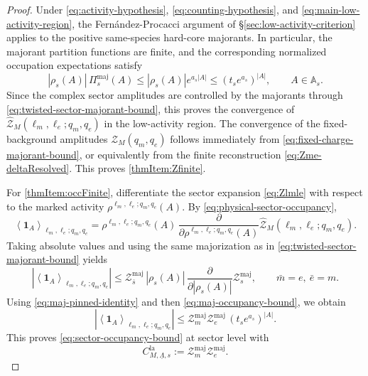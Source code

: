 \begin{proof}
	Under \eqref{eq:activity-hypothesis}, \eqref{eq:counting-hypothesis}, and
	\eqref{eq:main-low-activity-region}, the Fernández-Procacci argument of
	\S\ref{sec:low-activity-criterion} applies to the positive same-species hard-core
	majorants. In particular, the majorant partition functions are finite, and the
	corresponding normalized occupation expectations satisfy
	\begin{equation}
		|\rho_s(A)|\,\Pi_s^{\mathrm{maj}}(A)
		\le
		|\rho_s(A)|e^{a_s|A|}
		\le
		(t_s e^{a_s})^{|A|},
		\qquad
		A\in\mathbb A_s.
		\label{eq:maj-occupancy-bound}
	\end{equation}
	Since the complex sector amplitudes are controlled by the majorants through
	\eqref{eq:twisted-sector-majorant-bound}, this proves the convergence of
	\(\widehat{\mathcal Z}_M(\ell_m,\ell_e;q_m,q_e)\) in the low-activity region. The
	convergence of the fixed-background amplitudes \(\mathcal Z_M(q_m,q_e)\) follows
	immediately from \eqref{eq:fixed-charge-majorant-bound}, or equivalently from the
	finite reconstruction \eqref{eq:Zme-deltaResolved}. This proves
	\ref{thmItem:Zfinite}.
	
	For \ref{thmItem:occFinite}, differentiate the sector expansion \eqref{eq:Zlmle} with
	respect to the marked activity \(\rho^{\ell_m,\ell_e;q_m,q_e}(A)\). By
	\eqref{eq:physical-sector-occupancy},
	\begin{equation}
		\left\langle \mathbf 1_A \right\rangle_{\ell_m,\ell_e;q_m,q_e}
		=
		\rho^{\ell_m,\ell_e;q_m,q_e}(A)\,
		\frac{\partial}{\partial \rho^{\ell_m,\ell_e;q_m,q_e}(A)}
		\widehat{\mathcal Z}_M(\ell_m,\ell_e;q_m,q_e).
	\end{equation}
	Taking absolute values and using the same majorization as in
	\eqref{eq:twisted-sector-majorant-bound} yields
	\begin{equation}
		\left|
		\left\langle \mathbf 1_A \right\rangle_{\ell_m,\ell_e;q_m,q_e}
		\right|
		\le
		\mathcal Z_{\bar s}^{\mathrm{maj}}\,
		|\rho_s(A)|\,
		\frac{\partial}{\partial |\rho_s(A)|} \mathcal Z_s^{\mathrm{maj}},
		\qquad
		\bar m=e,\ \bar e=m.
	\end{equation}
	Using \eqref{eq:maj-pinned-identity} and then \eqref{eq:maj-occupancy-bound}, we obtain
	\begin{equation}
		\left|
		\left\langle \mathbf 1_A \right\rangle_{\ell_m,\ell_e;q_m,q_e}
		\right|
		\le
		\mathcal Z_m^{\mathrm{maj}}\mathcal Z_e^{\mathrm{maj}}\,
		(t_s e^{a_s})^{|A|}.
	\end{equation}
	This proves \eqref{eq:sector-occupancy-bound} at sector level with
	\begin{equation}
		C_{M,\underline\Lambda,s}^{\mathrm{la}}
		:=
		\mathcal Z_m^{\mathrm{maj}}\mathcal Z_e^{\mathrm{maj}}.
	\end{equation}
	

\end{proof}
